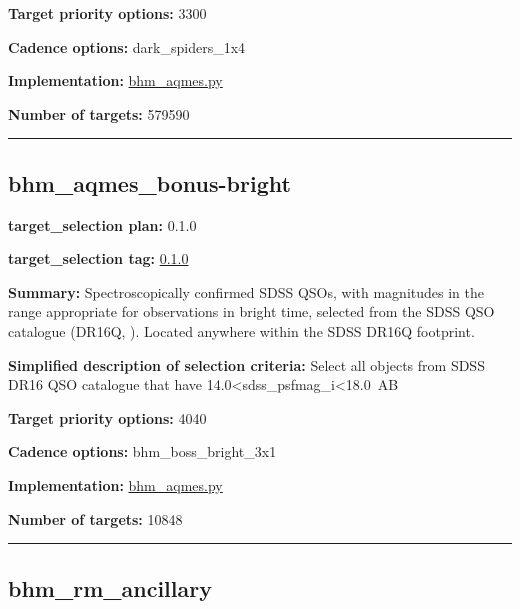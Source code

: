 \noindent\textbf{Target priority options:} 3300

\noindent\textbf{Cadence options:} dark\_spiders\_1x4

\noindent\textbf{Implementation:}
\href{https://github.com/sdss/target_selection/blob/0.1.0/python/target_selection/cartons/bhm_aqmes.py}{bhm\_aqmes.py}

\noindent\textbf{Number of targets:} 579590

\begin{center}\rule{0.5\linewidth}{0.5pt}\end{center}

\hypertarget{bhm_aqmes_bonus-bright_plan0.1.0}{%
\subsection{bhm\_aqmes\_bonus-bright}\label{bhm_aqmes_bonus-bright_plan0.1.0}}

\noindent\textbf{target\_selection plan:} 0.1.0

\noindent\textbf{target\_selection tag:}
\href{https://github.com/sdss/target_selection/tree/0.1.0/}{0.1.0}

\noindent\textbf{Summary:} Spectroscopically confirmed SDSS QSOs, with magnitudes
in the range appropriate for observations in bright time, selected from
the SDSS QSO catalogue (DR16Q,
\citealt{Lyke2020}). Located anywhere within the SDSS DR16Q footprint.

\noindent\textbf{Simplified description of selection criteria:} Select all
objects from SDSS DR16 QSO catalogue that have
14.0\textless sdss\_psfmag\_i\textless18.0~AB


\noindent\textbf{Target priority options:} 4040

\noindent\textbf{Cadence options:} bhm\_boss\_bright\_3x1

\noindent\textbf{Implementation:}
\href{https://github.com/sdss/target_selection/blob/0.1.0/python/target_selection/cartons/bhm_aqmes.py}{bhm\_aqmes.py}

\noindent\textbf{Number of targets:} 10848

\begin{center}\rule{0.5\linewidth}{0.5pt}\end{center}

\hypertarget{bhm_rm_ancillary_plan0.1.0}{%
\subsection{bhm\_rm\_ancillary}\label{bhm_rm_ancillary_plan0.1.0}}

